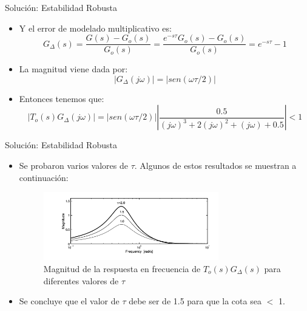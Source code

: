 \documentclass{beamer}
\begin{document}
\begin{frame}{Solución: Estabilidad Robusta}
\begin{justify}
\begin{itemize}
\justifying
\item Y el error de modelado multiplicativo es:
 \begin{equation}\label{robustez3}
    G_{\Delta}(s) = \frac{G(s)-G_o(s)}{G_o(s)}=\frac{e^{-s\tau}G_o(s)-G_o(s)}{G_o(s)}=e^{-s\tau}-1
\end{equation}
\item La magnitud viene dada por:
 \begin{equation}\label{robustez4}
    \left |G_{\Delta}(j\omega)\right| =  \left |sen(\omega\tau/2)\right|
\end{equation}
\item Entonces tenemos que:
 \begin{equation}\label{robustez4}
    \left |T_o(s)G_{\Delta}(j\omega)\right| =  \left |sen(\omega\tau/2)\right| \left |\frac{0.5}{(j\omega)^3+2(j\omega)^2+(j\omega)+0.5}\right| < 1
\end{equation}
\end{itemize}
\end{justify}
\end{frame}

\begin{frame}{Solución: Estabilidad Robusta}
\begin{justify}
\begin{itemize}
\justifying
\item Se probaron varios valores de $\tau$. Algunos de estos resultados se muestran a continuación:
\centering
\begin{figure}
    \includegraphics[width=3in]{imagenes/estabilidadRobustaEjemplo.png}
    \caption{Magnitud de la respuesta en frecuencia de $T_o(s)G_{\Delta}(s)$ para diferentes valores de $\tau$}
    \label{niquist-function}
\end{figure}
\item Se concluye que el valor de  $\tau$ debe ser de 1.5 para que la cota sea $<$ 1.   
\end{itemize}
\end{justify}
\end{frame}
\end{document}

